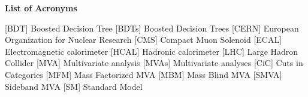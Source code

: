 



\listoffigures
\listoftables


\newpage
\thispagestyle{empty}
{}
\vspace*{1.95cm} \hspace*{-0.155cm} %
\textbf{{\huge \sffamily List of Acronyms}\\}
\vspace*{0.5cm}
\begin{acronym}[AAAAAA]
 [BDT] {Boosted Decision Tree}
 [BDTs] {Boosted Decision Trees}
 [CERN] {European Organization for Nuclear Research}
 [CMS] {Compact Muon Solenoid}
 [ECAL] {Electromagnetic calorimeter}
 [HCAL] {Hadronic calorimeter}
 [LHC] {Large Hadron Collider}
 [MVA] {Multivariate analysis}
 [MVAs] {Multivariate analyses}
 [CiC] {Cuts in Categories}
 [MFM] {Mass Factorized MVA}
 [MBM] {Mass Blind MVA}
 [SMVA] {Sideband MVA}
 [SM] {Standard Model}
\end{acronym}


